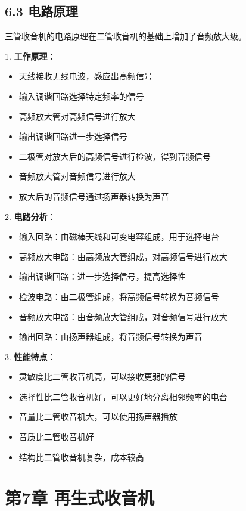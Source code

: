 \documentclass[12pt,UTF8]{ctexbook}
\begin{document}
\section*{6.3 电路原理}

三管收音机的电路原理在二管收音机的基础上增加了音频放大级。

1. \textbf{工作原理}：
   \begin{itemize}[leftmargin=3.5em]
   \item 天线接收无线电波，感应出高频信号
   \item 输入调谐回路选择特定频率的信号
   \item 高频放大管对高频信号进行放大
   \item 输出调谐回路进一步选择信号
   \item 二极管对放大后的高频信号进行检波，得到音频信号
   \item 音频放大管对音频信号进行放大
   \item 放大后的音频信号通过扬声器转换为声音
   \end{itemize}

2. \textbf{电路分析}：
   \begin{itemize}[leftmargin=3.5em]
   \item 输入回路：由磁棒天线和可变电容组成，用于选择电台
   \item 高频放大电路：由高频放大管组成，对高频信号进行放大
   \item 输出调谐回路：进一步选择信号，提高选择性
   \item 检波电路：由二极管组成，将高频信号转换为音频信号
   \item 音频放大电路：由音频放大管组成，对音频信号进行放大
   \item 输出回路：由扬声器组成，将音频信号转换为声音
   \end{itemize}

3. \textbf{性能特点}：
   \begin{itemize}[leftmargin=3.5em]
   \item 灵敏度比二管收音机高，可以接收更弱的信号
   \item 选择性比二管收音机好，可以更好地分离相邻频率的电台
   \item 音量比二管收音机大，可以使用扬声器播放
   \item 音质比二管收音机好
   \item 结构比二管收音机复杂，成本较高
   \end{itemize}

\chapter*{第7章 再生式收音机}
\end{document}
